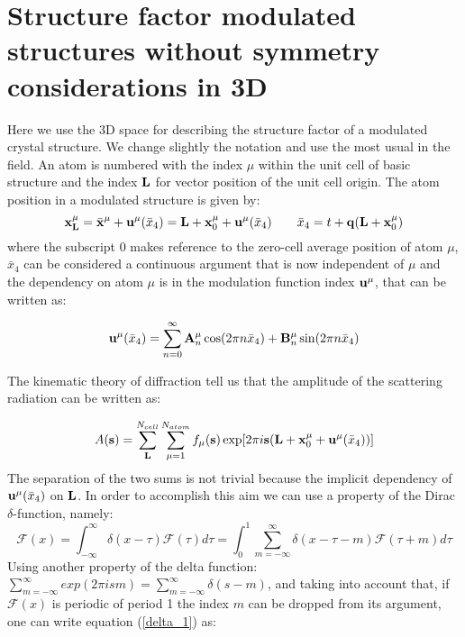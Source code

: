 \documentclass[10pt]{article}
\begin{document}
\section{Structure factor modulated structures without symmetry considerations in 3D}

Here we use the 3D space for describing the structure factor of a modulated crystal structure. We change slightly the notation and use the most usual in the field. An atom is numbered with the index $\mu$ within the unit cell of basic structure and the index ${\bf L}$ for vector position of the  unit cell origin. The atom position in a modulated structure is given by:
\begin{equation} \label{atom_modulated}
{\bf x}_{\bf L}^{\mu}= \bar {\bf x}^{\mu} +  {\bf u}^{\mu}(\bar x_4) = {\bf L} + {\bf x}_0^{\mu} +  {\bf u}^{\mu}(\bar x_4) \qquad \bar x_4=t+{\bf q} ({\bf L} +  {\bf x}_0^{\mu})
\end{equation}
 where the subscript $0$ makes reference to the zero-cell average position of atom $\mu$, $\bar x_4$ can be considered a continuous argument that is now independent of $\mu$ and the dependency on atom $\mu$ is in the modulation function index ${\bf u}^{\mu}$,  that can be written as:

\begin{equation} \label{modulation_u}
{\bf u}^{\mu}(\bar x_4)= \sum_{n=0}^\infty {\bf A}_n^{\mu} \cos(2\pi n \bar x_4)+ {\bf B}_n^{\mu} \sin(2\pi n \bar x_4)
\end{equation}

The kinematic theory of diffraction tell us that the amplitude of the scattering radiation can be written as:

\begin{equation} \label{scat_amplitude}
A({\bf s})= \sum_{\bf L}^{N_{cell}} \sum_{\mu=1}^{N_{atom}}f_{\mu}({\bf s})\exp[2 \pi i {\bf s}({\bf L} + {\bf x}_0^{\mu} +  {\bf u}^{\mu}(\bar x_4))]
\end{equation}
The separation of the two sums is not trivial because the implicit dependency of ${\bf u}^{\mu}(\bar x_4)$ on ${\bf L}$. In order to accomplish this aim we can use a property of the Dirac $\delta$-function, namely:
\begin{equation} \label{delta_1}
\mathcal{F}(x)= \int_{-\infty}^{\infty} \delta(x-\tau) \mathcal{F}(\tau) d\tau = \int_{0}^{1} \sum_{m=-\infty}^{\infty} \delta(x-\tau - m) \mathcal{F}(\tau+m) d\tau 
\end{equation}
Using another property of the delta function: $\sum_{m=-\infty}^{\infty} exp(2\pi i s m)=\sum_{m=-\infty}^{\infty} \delta(s-m)$, and taking into account that, if $\mathcal{F}(x)$ is periodic of period 1 the index $m$ can be dropped from its argument, one can write equation (\ref{delta_1}) as:
\end{document}
